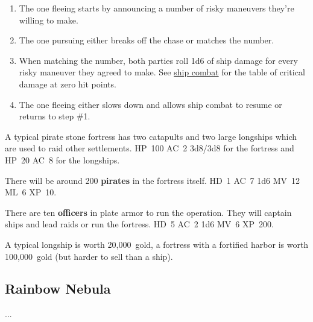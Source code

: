\documentclass[11pt]{bxart}
\begin{document}
\begin{enumerate}
\item The one fleeing starts by announcing a number of risky maneuvers
  they're willing to make.
\item The one pursuing either breaks off the chase or matches the
  number.
\item When matching the number, both parties roll 1d6 of ship damage
  for every risky maneuver they agreed to make. See
  \hyperref[sec:ship-combat]{ship combat} for the table of critical
  damage at zero hit points.
\item The one fleeing either slows down and allows ship
  combat to resume or returns to step \#1.
\end{enumerate}
 
A typical pirate stone fortress has two catapults and two large
longships which are used to raid other settlements. HP~100 AC~2
3d8/3d8 for the fortress and HP~20 AC~8 for the longships.

There will be around 200 \textbf{pirates} in the fortress itself. HD~1
AC~7 1d6 MV~12 ML~6 XP~10.

There are ten \textbf{officers} in plate armor to run the operation.
They will captain ships and lead raids or run the fortress. HD~5 AC~2
1d6 MV~6 XP~200.

A typical longship is worth 20,000~gold, a fortress with a fortified
harbor is worth 100,000~gold (but harder to sell than a ship).

\subsection{Rainbow Nebula}

...
\end{document}
